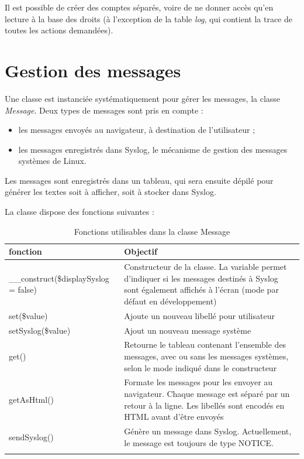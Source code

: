 Il est possible de créer des comptes séparés, voire de ne donner accès qu'en lecture à la base des droits (à l'exception de la table \textit{log}, qui contient la trace de toutes les actions demandées).

\section{Gestion des messages}

Une classe est instanciée systématiquement pour gérer les messages, la classe \textit{Message}. Deux types de messages sont pris en compte :
\begin{itemize}
\item les messages envoyés au navigateur, à destination de l'utilisateur ;
\item les messages enregistrés dans Syslog, le mécanisme de gestion des messages systèmes de Linux.
\end{itemize}

Les messages sont enregistrés dans un tableau, qui sera ensuite dépilé pour générer les textes soit à afficher, soit à stocker dans Syslog.

La classe dispose des fonctions suivantes :
\begin{longtable}{|p{5cm}|p{8cm}|}
\hline
\textbf{fonction} & \textbf{Objectif} \\
\hline
\endhead
\hline\endfoot\endlastfoot
\_\_construct(\$displaySyslog = false) & Constructeur de la classe. La variable permet d'indiquer si les messages destinés à Syslog sont également affichés à l'écran (mode par défaut en développement) \\
set(\$value) & Ajoute un nouveau libellé pour utilisateur \\
setSyslog(\$value) & Ajout un nouveau message système \\
get() & Retourne le tableau contenant l'ensemble des messages, avec ou sans les messages systèmes, selon le mode indiqué dans le constructeur \\
getAsHtml() & Formate les messages pour les envoyer au navigateur. Chaque message est séparé par un retour à la ligne. Les libellés sont encodés en HTML avant d'être envoyés \\
sendSyslog() & Génère un message dans Syslog. Actuellement, le message est toujours de type NOTICE. \\
\hline

\caption{Fonctions utilisables dans la classe Message}
\end{longtable}

